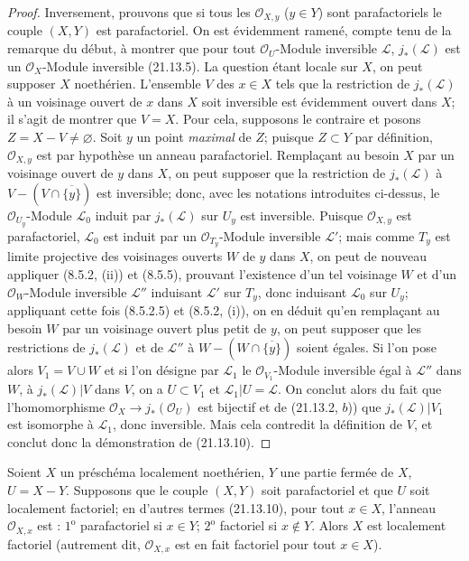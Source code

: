\begin{proof}
Inversement, prouvons que si tous les $\mathcal O_{X,y}$ ($y\in Y$) sont
parafactoriels le couple $(X,Y)$ est parafactoriel. On est évidemment ramené, compte
tenu de la remarque du début, à montrer que pour tout $\mathcal O_U$-Module inversible
$\mathscr L$, $j_*(\mathscr L)$ est un $\mathcal O_X$-Module inversible (21.13.5).
La question étant locale sur $X$, on peut supposer $X$ noethérien. L'ensemble $V$ des
$x\in X$ tels que la restriction de $j_*(\mathscr L)$ à un voisinage ouvert de $x$
dans $X$ soit inversible est évidemment ouvert dans $X$; il s'agit de montrer que
$V=X$. Pour cela, supposons le contraire et posons $Z=X-V\neq\varnothing$. Soit $y$
un point \emph{maximal} de $Z$; puisque $Z\subset Y$ par définition,
$\mathcal O_{X,y}$ est par hypothèse un anneau parafactoriel. Remplaçant au besoin
$X$ par un voisinage ouvert de $y$ dans $X$, on peut supposer que la restriction de
$j_*(\mathscr L)$
à $V-(V\cap\overline{\{y\}})$ est inversible; donc, avec les notations introduites
ci-dessus, le $\mathcal O_{U_y}$-Module $\mathscr L_0$ induit par $j_*(\mathscr L)$
sur $U_y$ est inversible. Puisque $\mathcal O_{X,y}$ est parafactoriel,
$\mathscr L_0$ est induit par un $\mathcal O_{T_y}$-Module inversible $\mathscr L'$;
mais comme $T_y$ est limite projective des voisinages ouverts $W$ de $y$ dans $X$,
on peut de nouveau appliquer (8.5.2, (ii)) et (8.5.5), prouvant l'existence d'un tel
voisinage $W$ et d'un $\mathcal O_W$-Module inversible $\mathscr L''$ induisant
$\mathscr L'$ sur $T_y$, donc induisant $\mathscr L_0$ sur $U_y$; appliquant cette
fois (8.5.2.5) et (8.5.2, (i)), on en déduit qu'en remplaçant au besoin $W$ par un
voisinage ouvert plus petit de $y$, on peut supposer que les restrictions de
$j_*(\mathscr L)$ et de $\mathscr L''$ à
$W-(W\cap\overline{\{y\}})$ soient égales. Si l'on pose alors $V_1=V\cup W$ et si
l'on désigne par $\mathscr L_1$ le $\mathcal O_{V_1}$-Module inversible égal à
$\mathscr L''$ dans $W$, à $j_*(\mathscr L)|V$ dans $V$, on a $U\subset V_1$ et
$\mathscr L_1|U=\mathscr L$. On conclut alors du fait que l'homomorphisme
$\mathcal O_X\to j_*(\mathcal O_U)$ est bijectif et de (21.13.2, $b$)) que
$j_*(\mathscr L)|V_1$ est isomorphe à $\mathscr L_1$, donc inversible. Mais cela
contredit la définition de $V$, et conclut donc la démonstration de (21.13.10).
\end{proof}

\begin{corollary}[21.13.11]
\label{IV.21.13.11}
Soient $X$ un préschéma localement noethérien, $Y$ une partie fermée de $X$,
$U=X-Y$. Supposons que le couple $(X,Y)$ soit parafactoriel et que $U$ soit
localement factoriel; en d'autres termes (21.13.10), pour tout $x\in X$, l'anneau
$\mathcal O_{X,x}$ est : $1^{\mathrm o}$ parafactoriel si $x\in Y$;
$2^{\mathrm o}$ factoriel si $x\notin Y$. Alors $X$ est localement factoriel
(autrement dit, $\mathcal O_{X,x}$ est en fait factoriel pour tout $x\in X$).
\end{corollary}


